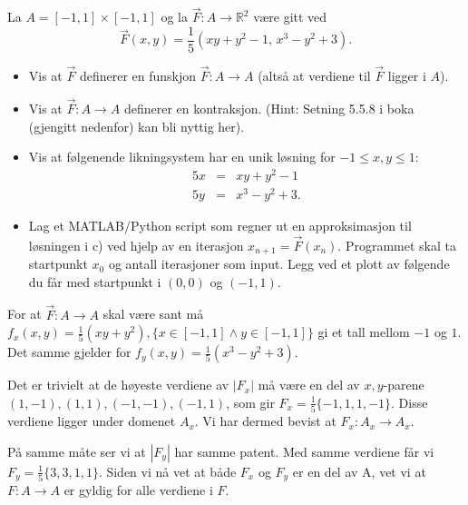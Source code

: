 \documentclass{../../myassignment}
\begin{document}
	\pagebreak
	\begin{problem}
		La $A = [-1,1]\times[-1,1]$ og la $\vec{F} : A \to \mathbb{R}^2$ være gitt ved $$\vec{F}(x,y)=\frac{1}{5}(xy+y^2-1, \,x^3-y^2+3).$$

		\begin{itemize}
			\item Vis at $\vec{F}$ definerer en funskjon $\vec{F} : A \to A$ (altså at verdiene til $\vec{F}$ ligger i $A$).
			\item Vis at $\vec{F} : A \to A$ definerer en kontraksjon. (Hint: Setning 5.5.8 i boka (gjengitt nedenfor) kan bli nyttig her).
			\item Vis at følgenende likningsystem har en unik løsning for $-1 \leq x,y \leq 1$: 
				\begin{eqnarray*}
					5x &=& xy + y^2 - 1 \\
					5y &=& x^3 - y^2 + 3.
				\end{eqnarray*}
			\item Lag et MATLAB/Python script som regner ut en approksimasjon til løsningen i c) ved hjelp av en iterasjon $x_{n+1} = \vec{F}(x_n)$. Programmet skal ta startpunkt $x_0$ og antall iterasjoner som input. Legg ved et plott av følgende du får med startpunkt i $(0,0)$ og $(-1,1)$.
		\end{itemize}

	\end{problem}

	\begin{answer}
		For at $\vec{F} : A \to A$ skal være sant må $f_x(x,y) = \frac{1}{5}(xy+y^2), \{x \in [-1, 1] \land y \in [-1,1]\}$ gi et tall mellom $-1$ og $1$. Det samme gjelder for $f_y(x,y) = \frac{1}{5}(x^3 - y^2 + 3)$. 

		Det er trivielt at de høyeste verdiene av $|F_x|$ må være en del av $x,y$-parene $(1,-1), (1,1), (-1,-1), (-1,1)$, som gir $F_x = \frac{1}{5}\{-1, 1, 1, -1\}$. Disse verdiene ligger under domenet $A_x$. Vi har dermed bevist at $F_x : A_x \to A_x$. 

		På samme måte ser vi at $|F_y|$ har samme patent. Med samme verdiene får vi $F_y = \frac{1}{5}\{3, 3, 1, 1\}$. Siden vi nå vet at både $F_x$ og $F_y$ er en del av A, vet vi at $F : A \to A$ er gyldig for alle verdiene i $F$.

	\end{answer}
\end{document}

